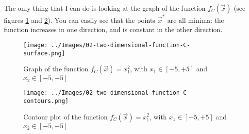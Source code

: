     The only thing that I can do is looking at the graph of the function \(f_C(\vec{x})\) (see figures \ref{two-dimensional-function-C-surface} and \ref{two-dimensional-function-C-contours}). You can easily see that the points \(\vec{x}^*\) are all minima: the function increases in one direction, and is constant in the other direction.
    \begin{figure}
        \centering
        \texttt{[image: ../Images/02-two-dimensional-function-C-surface.png]}
        \caption{Graph of the function \(f_C(\vec{x}) = x_{1}^{2}\), with \(x_1 \in [-5, +5]\) and \(x_2 \in [-5, +5]\)}
        \label{two-dimensional-function-C-surface}
    \end{figure}
    \begin{figure}
        \centering
        \texttt{[image: ../Images/02-two-dimensional-function-C-contours.png]}
        \caption{Contour plot of the function \(f_C(\vec{x}) = x_{1}^{2}\), with \(x_1 \in [-5, +5]\) and \(x_2 \in [-5, +5]\)}
        \label{two-dimensional-function-C-contours}
    \end{figure}